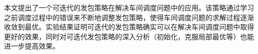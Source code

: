 本文提出了一个可迭代的发包策略在解决车间调度问题中的应用。该策略通过学习之前调度过程中的错误来不断地调整发包策略，使得车间调度问题的求解过程逐渐收敛到最优。实验结果证明可迭代的发包策略确实可以在解决车间调度问题中取得更好的效果，同时对可迭代发包策略的深入分析（初始化，克服局部最优等）也能进一步提高效果。